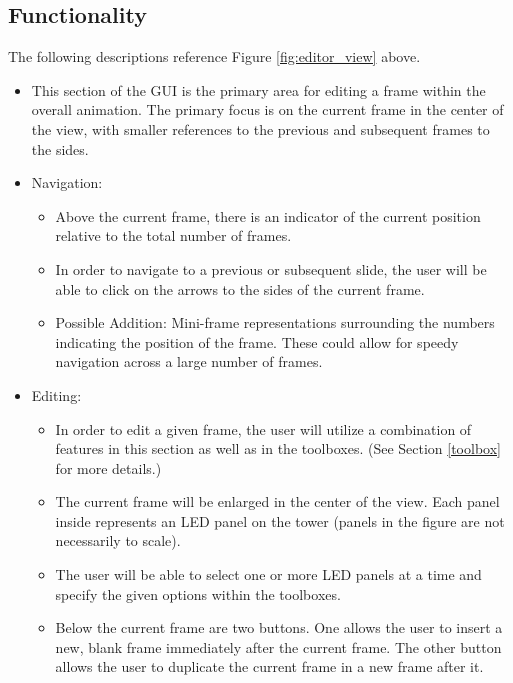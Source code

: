 \documentclass{article}
\begin{document}
	\subsection{Functionality}
	The following descriptions reference Figure \ref{fig:editor_view} above.
	\begin{itemize}
		\item This section of the GUI is the primary area for editing a frame within the overall animation. The primary focus is on the current frame in the center of the view, with smaller references to the previous and subsequent frames to the sides.
		\item Navigation:
		\begin{itemize}
			\item Above the current frame, there is an indicator of the current position relative to the total number of frames.
			\item In order to navigate to a previous or subsequent slide, the user will be able to click on the arrows to the sides of the current frame.
			\item Possible Addition: Mini-frame representations surrounding the numbers indicating the position of the frame. These could allow for speedy navigation across a large number of frames.
		\end{itemize}
		\item Editing:
		\begin{itemize}
			\item In order to edit a given frame, the user will utilize a combination of features in this section as well as in the toolboxes. (See Section \ref{toolbox} for more details.)
			\item The current frame will be enlarged in the center of the view. Each panel inside represents an LED panel on the tower (panels in the figure are not necessarily to scale).
			\item The user will be able to select one or more LED panels at a time and specify the given options within the toolboxes.
			\item Below the current frame are two buttons. One allows the user to insert a new, blank frame immediately after the current frame. The other button allows the user to duplicate the current frame in a new frame after it.
		\end{itemize}
	\end{itemize}
	
\end{document}
